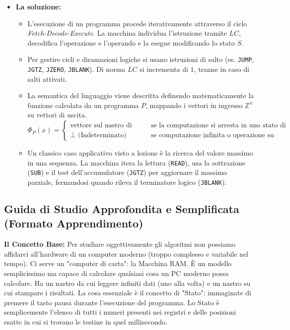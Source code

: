 \documentclass[a4paper, 11pt]{report}
\begin{document}
\begin{itemize}
\item \textbf{La soluzione:}
\begin{itemize}
    \item L'esecuzione di un programma procede iterativamente attraverso il ciclo \textit{Fetch-Decode-Execute}. La macchina individua l'istruzione tramite $LC$, decodifica l'operazione e l'operando e la esegue modificando lo stato $S$.
    \item Per gestire cicli e diramazioni logiche si usano istruzioni di salto (es. \texttt{JUMP}, \texttt{JGTZ}, \texttt{JZERO}, \texttt{JBLANK}). Di norma $LC$ si incrementa di $1$, tranne in caso di salti attivati.
    \item La semantica del linguaggio viene descritta definendo matematicamente la funzione calcolata da un programma $P$, mappando i vettori in ingresso $\mathbb{Z}^n$ su vettori di uscita.
    \begin{equation*}
    \Phi_P(x) =
    \begin{cases}
    \text{vettore sul nastro di output} & \text{se la computazione si arresta in uno stato di HALT} \\
    \perp \text{ (Indeterminato)} & \text{se computazione infinita o operazione su operandi mal definiti}
    \end{cases}
    \end{equation*}
    \item Un classico caso applicativo visto a lezione è la ricerca del valore massimo in una sequenza. La macchina itera la lettura (\texttt{READ}), usa la sottrazione (\texttt{SUB}) e il test dell'accumulatore (\texttt{JGTZ}) per aggiornare il massimo parziale, fermandosi quando rileva il terminatore logico (\texttt{JBLANK}).
\end{itemize}
\end{itemize}

\vspace{0.5cm}
\subsection*{Guida di Studio Approfondita e Semplificata (Formato Apprendimento)}


\textbf{Il Concetto Base:}
Per studiare oggettivamente gli algoritmi non possiamo affidarci all'hardware di un computer moderno (troppo complesso e variabile nel tempo). Ci serve un "computer di carta": la Macchina RAM. È un modello semplicissimo ma capace di calcolare qualsiasi cosa un PC moderno possa calcolare.
Ha un nastro da cui leggere infiniti dati (uno alla volta) e un nastro su cui stampare i risultati. La cosa essenziale è il concetto di "Stato": immaginate di premere il tasto pausa durante l'esecuzione del programma. Lo Stato è semplicemente l'elenco di tutti i numeri presenti nei registri e delle posizioni esatte in cui si trovano le testine in quel millisecondo.
\end{document}
